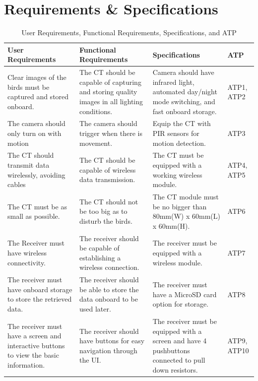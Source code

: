 \documentclass[class=report,11pt,crop=false]{standalone}
\begin{document}
\section{Requirements \& Specifications}
\begin{table}[ht]
\centering
\begin{tabular}{|p{4cm}|p{5cm}|p{5cm}|p{1cm}|}
\hline
\textbf{User Requirements} & \textbf{Functional Requirements} & \textbf{Specifications} & \textbf{ATP} \\
\hline
Clear images of the birds must be captured and stored onboard. & The CT should be capable of capturing and storing quality images in all lighting conditions. & Camera should have infrared light, automated day/night mode switching, and fast onboard storage. & ATP1, ATP2 \\
\hline
The camera should only turn on with motion & The camera should trigger when there is movement. & Equip the CT with PIR sensors for motion detection. & ATP3 \\
\hline
The CT should transmit data wirelessly, avoiding cables & The CT should be capable of wireless data transmission. & The CT must be equipped with a working wireless module. & ATP4, ATP5 \\
\hline
The CT must be as small as possible. & The CT should not be too big as to disturb the birds. & The CT module must be no bigger than 80mm(W) x 60mm(L) x 60mm(H). & ATP6 \\
\hline
The Receiver must have wireless connectivity. & The receiver should be capable of establishing a wireless connection. & The receiver must be equipped with a wireless module. & ATP7 \\
\hline
The receiver must have onboard storage to store the retrieved data. & The receiver should be able to store the data onboard to be used later. & The receiver must have a MicroSD card option for storage. & ATP8 \\
\hline
The receiver must have a screen and interactive buttons to view the basic information. & The receiver should have buttons for easy navigation through the UI. & The receiver must be equipped with a screen and have 4 pushbuttons connected to pull down resistors. & ATP9, ATP10 \\
\hline
\end{tabular}
\caption{User Requirements, Functional Requirements, Specifications, and ATP}
\label{tab:my_label1}
\end{table}
\end{document}
